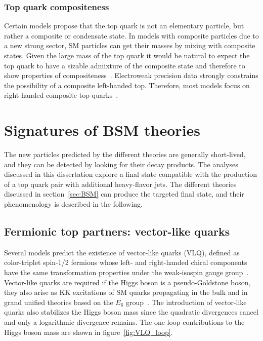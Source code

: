 \subsubsection{Top quark compositeness}
Certain models propose that the top quark is not an elementary particle, but rather a composite or condensate state.
In models with composite particles due to a new strong sector, SM particles can get their masses by mixing with composite states. Given the large mass of the top quark it would be natural to expect the top quark to have a sizable admixture of the composite state and therefore to show properties of compositeness~\cite{Pomarol:2008bh,Kumar:2009vs}. Electroweak precision data strongly constrains the possibility of a composite left-handed top. Therefore, most models focus on right-handed composite top quarks~\cite{Lillie:2007hd,Georgi:1994ha}.

\section{Signatures of BSM theories}
The new particles predicted by the different theories are generally short-lived, and they can be detected by looking for their decay products. 
The analyses discussed in this dissertation explore a final state compatible with the production of a top quark pair with additional heavy-flavor jets. The different theories discussed in section~\ref{sec:BSM} can produce the targeted final state, and their phenomenology is described in the following.

\subsection{Fermionic top partners: vector-like quarks}
Several models predict the existence of vector-like quarks (VLQ), defined as color-triplet \mbox{spin-1/2} fermions whose left- and right-handed chiral components have the same transformation properties under the weak-isospin gauge group~\cite{delAguila:1982fs,AguilarSaavedra:2009es}. 
Vector-like quarks are required if the Higgs  boson is a pseudo-Goldstone boson, they also arise as KK excitations of SM quarks propagating in the bulk and in grand unified theories based on the $E_6$ group~\cite{Frampton:1999xi,Hewett1989193}.
The introduction of vector-like quarks also stabilizes the Higgs boson mass since the quadratic divergences cancel and only a logarithmic divergence remains. The one-loop contributions to the Higgs boson mass are shown in figure~\ref{fig:VLQ_loop}.

